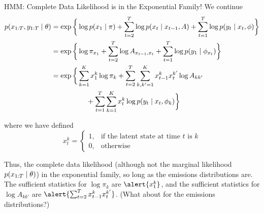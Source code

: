 \documentclass[10pt]{beamer}
\begin{document}
\begin{frame}{HMM: Complete Data Likelihood is in the Exponential Family!}
We continue 
 \footnotesize
\begin{align}
p(x_{1:T}, y_{1:T} \; | \; \theta) &=  \exp\bigg \{ \log p(x_1 \; | \; \pi) + \displaystyle\sum_{t=2}^T \log p(x_t \; | \; x_{t-1}, A) +  \displaystyle\sum_{t=1}^T \log p(y_t \; | \; x_t, \phi) \bigg\}  \nonumber \\
&= \exp \bigg \{ \log \pi_{x_1}  + \displaystyle\sum_{t=2}^T \log A_{x_{t-1}, x_t} + \displaystyle\sum_{t=1}^T \log p(y_1 \; | \; \phi_{x_t}) \bigg\} \label{eqn:hmm_cdl_ef_compact} \\
&=  \exp\bigg \{  \displaystyle\sum_{k=1}^K x_1^k \log \pi_k + \displaystyle\sum_{t=2}^T \displaystyle\sum_{k, k'=1}^K x_{t-1}^k x_t^{k'} \log A_{kk'} \nonumber \\ 
&\quad\quad\quad\quad\quad  + \displaystyle\sum_{t=1}^T \displaystyle\sum_{k=1}^K x_t^k \log p(y_t \; | \; x_t, \phi_k)  \bigg\} \label{eqn:hmm_ef_form}
\end{align}

\tiny where we have defined
\[ x_t^k =  
\begin{cases}	  
1, & \text{if the latent state at time $t$ is $k$} \\
0, & \text{otherwise}
\end{cases} \]

\vfill
 \footnotesize

Thus, the complete data likelihood \tiny (although not the marginal  likelihood $p(x_{1:T} \; | \; \theta)$) \footnotesize in the exponential family, so long as the emissions distributions are.   The sufficient statistics for $\log \pi_k$ are $\alert{x_1^k}$, and the sufficient statistics for $\log A_{kk'}$ are $\alert{\sum_{t=2}^T x_{t-1}^k x_t^{k'}}$. \pause \tiny (What about for the emissions distributions?)

\end{frame}
\end{document}
